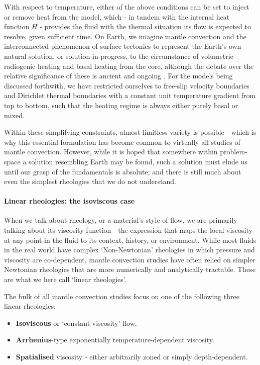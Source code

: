 \documentclass[a4paper,11pt,oneside]{book}
\begin{document}
With respect to temperature, either of the above conditions can be set to inject or remove heat from the model, which - in tandem with the internal heat function $H$ - provides the fluid with the thermal situation its flow is expected to resolve, given sufficient time. On Earth, we imagine mantle convection and the interconnected phenomenon of surface tectonics to represent the Earth's own natural solution, or solution-in-progress, to the circumstance of volumetric radiogenic heating and basal heating from the core, although the debate over the relative significance of these is ancient and ongoing \citet{Thomson1862-kb, Urey1955-zs, Korenaga2003-oy, Korenaga2008-js, Gando2011-sh, Mareschal2012-ie, Huang2013-eu, Jaupart2015-un}. For the models being discussed forthwith, we have restricted ourselves to free-slip velocity boundaries and Dirichlet thermal boundaries with a constant unit temperature gradient from top to bottom, such that the heating regime is always either purely basal or mixed.

Within these simplifying constraints, almost limitless variety is possible - which is why this essential formulation has become common to virtually all studies of mantle convection. However, while it is hoped that somewhere within problem-space a solution resembling Earth may be found, such a solution must elude us until our grasp of the fundamentals is absolute; and there is still much about even the simplest rheologies that we do not understand.

\paragraph{Linear rheologies: the isoviscous case}

When we talk about rheology, or a material's style of flow, we are primarily talking about its viscosity function - the expression that maps the local viscosity at any point in the fluid to its context, history, or environment. While most fluids in the real world have complex `Non-Newtonian' rheologies in which pressure and viscosity are co-dependent, mantle convection studies have often relied on simpler Newtonian rheologies that are more numerically and analytically tractable. These are what we here call `linear rheologies'.

The bulk of all mantle convection studies focus on one of the following three linear rheologies:

\begin{itemize}
\item \textbf{Isoviscous} or `constant viscosity' flow.
\item \textbf{Arrhenius}-type exponentially temperature-dependent viscosity.
\item \textbf{Spatialised} viscosity - either arbitrarily zoned or simply depth-dependent.
\end{itemize}
\end{document}
